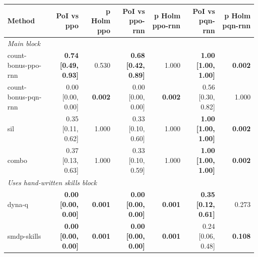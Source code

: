 \begin{tabular}{lrrrrrr}
\toprule
Method & PoI vs ppo & p Holm ppo & PoI vs ppo-rnn & p Holm ppo-rnn & PoI vs pqn-rnn & p Holm pqn-rnn \\
\midrule
\multicolumn{7}{l}{\emph{Main block}} \\
count-bonus-ppo-rnn & \textbf{0.74 [0.49, 0.93]} & 0.530 & \textbf{0.68 [0.42, 0.89]} & 1.000 & \textbf{1.00 [1.00, 1.00]} & \textbf{0.002} \\
count-bonus-pqn-rnn & 0.00 [0.00, 0.00] & \textbf{0.002} & 0.00 [0.00, 0.00] & \textbf{0.002} & 0.56 [0.30, 0.82] & 1.000 \\
sil & 0.35 [0.11, 0.62] & 1.000 & 0.33 [0.10, 0.60] & 1.000 & \textbf{1.00 [1.00, 1.00]} & \textbf{0.002} \\
combo & 0.37 [0.13, 0.63] & 1.000 & 0.33 [0.10, 0.59] & 1.000 & \textbf{1.00 [1.00, 1.00]} & \textbf{0.002} \\
\midrule
\multicolumn{7}{l}{\emph{Uses hand-written skills block}} \\
dyna-q & \textbf{0.00 [0.00, 0.00]} & \textbf{0.001} & \textbf{0.00 [0.00, 0.00]} & \textbf{0.001} & \textbf{0.35 [0.12, 0.61]} & 0.273 \\
smdp-skills & \textbf{0.00 [0.00, 0.00]} & \textbf{0.001} & \textbf{0.00 [0.00, 0.00]} & \textbf{0.001} & 0.24 [0.06, 0.48] & \textbf{0.108} \\
\bottomrule
\end{tabular}
